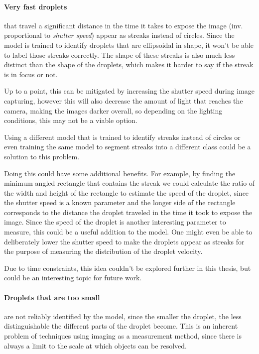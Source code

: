 \paragraph{Very fast droplets} that travel a significant distance in the time it takes to expose the image (inv. proportional to \emph{shutter speed}) appear as streaks instead of circles. 
Since the model is trained to identify droplets that are ellipsoidal in shape, it won't be able to label those streaks correctly.
The shape of these streaks is also much less distinct than the shape of the droplets, which makes it harder to say if the streak is in focus or not.

Up to a point, this can be mitigated by increasing the shutter speed during image capturing, however this will also decrease the amount of light that reaches the camera, making the images darker overall, so depending on the lighting conditions, this may not be a viable option.

Using a different model that is trained to identify streaks instead of circles or even training the same model to segment streaks into a different class could be a solution to this problem. 

Doing this could have some additional benefits.
For example, by finding the minimum angled rectangle that contains the streak we could calculate the ratio of the width and height of the rectangle to estimate the speed of the droplet, since the shutter speed is a known parameter and the longer side of the rectangle corresponds to the distance the droplet traveled in the time it took to expose the image.
Since the speed of the droplet is another interesting parameter to measure, this could be a useful addition to the model.
One might even be able to deliberately lower the shutter speed to make the droplets appear as streaks for the purpose of measuring the distribution of the droplet velocity.

Due to time constraints, this idea couldn't be explored further in this thesis, but could be an interesting topic for future work.

\paragraph{Droplets that are too small} are not reliably identified by the model, since the smaller the droplet, the less distinguishable the different parts of the droplet become. 
This is an inherent problem of techniques using imaging as a measurement method, since there is always a limit to the scale at which objects can be resolved.

